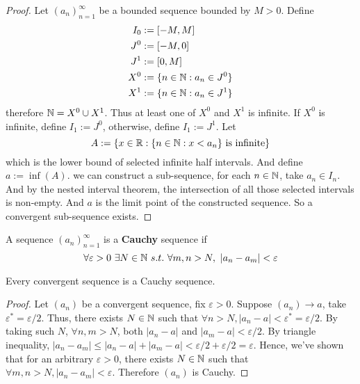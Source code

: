 \documentclass[11pt]{article}
\newcommand{\seq}[2]{({#1}_{#2})_{{#2}=1}^\infty}
\begin{document}
        \begin{proof}
            Let $\seq{a}{n}$ be a bounded sequence bounded by $M > 0$. Define
            \begin{align}
                I_0 &:= [-M, M] \\
                J^0 &:= [-M, 0] \\
                J^1 &:= [0, M] \\
                X^0 &:= \{n \in \mathbb{N}: a_n \in J^0\} \\
                X^1 &:= \{n \in \mathbb{N}: a_n \in J^1\}
            \end{align}
            therefore $\mathbb{N} = X^0 \cup X^1$. Thus at least one of $X^0$ and $X^1$ is infinite. If $X^0$ is infinite, define $I_1 := J^0$, otherwise, define $I_1 := J^1$. Let 
            \begin{equation}
                A := \{x \in \mathbb{R}: \{n \in \mathbb{N}: x < a_n\} \text{{ is infinite}} \}
            \end{equation}
            which is the lower bound of selected infinite half intervals. And define $a:= \inf(A)$. we can construct a sub-sequence, for each $n \in \mathbb{N}$, take $a_n \in I_n$. And by the nested interval theorem, the intersection of all those selected intervals is non-empty. And $a$ is the limit point of the constructed sequence. So a convergent sub-sequence exists.
        \end{proof}
        
        \begin{definition}
            A sequence $\seq{a}{n}$ is a \textbf{Cauchy} sequence if 
            \begin{equation}
                \forall \varepsilon > 0\ \exists N \in \N\ s.t.\ \forall m, n > N,\ |a_n - a_m| < \varepsilon
            \end{equation}
        \end{definition}
        
        \begin{theorem}
            Every convergent sequence is a Cauchy sequence.
        \end{theorem}
        
        \begin{proof}
            Let $(a_n)$ be a convergent sequence, fix $\varepsilon > 0$. Suppose $(a_n) \to a$, take $\varepsilon^* = \varepsilon / 2$. Thus, there exists $N \in \mathbb{N}$ such that $\forall n > N, |a_n - a| < \varepsilon^* = \varepsilon / 2$. By taking such $N$, $\forall n, m > N$, both $|a_n - a|$ and $|a_m - a| < \varepsilon / 2$. By triangle inequality, $|a_n - a_m| \leq |a_n - a| + |a_m - a| < \varepsilon / 2 + \varepsilon / 2 = \varepsilon$. Hence, we've shown that for an arbitrary $\varepsilon > 0$, there exists $N \in \mathbb{N}$ such that $\forall m, n > N, |a_n - a_m| < \varepsilon$. Therefore $(a_n)$ is Cauchy.
        \end{proof}
        
\end{document}
